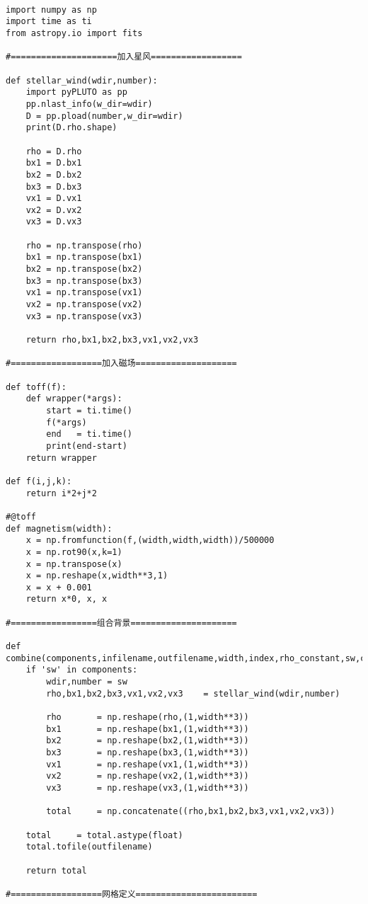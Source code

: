 \begin{lstlisting}

import numpy as np
import time as ti
from astropy.io import fits

#=====================加入星风==================

def stellar_wind(wdir,number):
    import pyPLUTO as pp
    pp.nlast_info(w_dir=wdir)
    D = pp.pload(number,w_dir=wdir)
    print(D.rho.shape)

    rho = D.rho
    bx1 = D.bx1
    bx2 = D.bx2
    bx3 = D.bx3
    vx1 = D.vx1
    vx2 = D.vx2
    vx3 = D.vx3

    rho = np.transpose(rho)
    bx1 = np.transpose(bx1)
    bx2 = np.transpose(bx2)
    bx3 = np.transpose(bx3)
    vx1 = np.transpose(vx1)
    vx2 = np.transpose(vx2)
    vx3 = np.transpose(vx3)

    return rho,bx1,bx2,bx3,vx1,vx2,vx3

#==================加入磁场====================

def toff(f):
    def wrapper(*args):
        start = ti.time()
        f(*args)
        end   = ti.time()
        print(end-start)
    return wrapper

def f(i,j,k):
    return i*2+j*2

#@toff
def magnetism(width):
    x = np.fromfunction(f,(width,width,width))/500000
    x = np.rot90(x,k=1)
    x = np.transpose(x)
    x = np.reshape(x,width**3,1)
    x = x + 0.001
    return x*0, x, x

#=================组合背景=====================

def combine(components,infilename,outfilename,width,index,rho_constant,sw,clump,mag):
    if 'sw' in components:
        wdir,number = sw
        rho,bx1,bx2,bx3,vx1,vx2,vx3    = stellar_wind(wdir,number)

        rho       = np.reshape(rho,(1,width**3))
        bx1       = np.reshape(bx1,(1,width**3))
        bx2       = np.reshape(bx2,(1,width**3))
        bx3       = np.reshape(bx3,(1,width**3))
        vx1       = np.reshape(vx1,(1,width**3))
        vx2       = np.reshape(vx2,(1,width**3))
        vx3       = np.reshape(vx3,(1,width**3))

        total     = np.concatenate((rho,bx1,bx2,bx3,vx1,vx2,vx3))

    total     = total.astype(float)
    total.tofile(outfilename)

    return total

#==================网格定义========================


\end{lstlisting}
